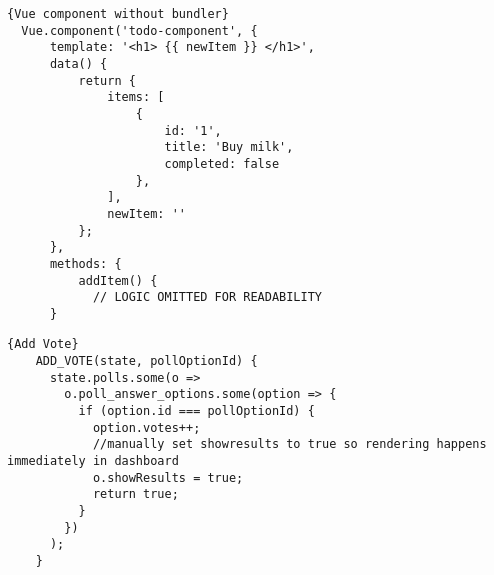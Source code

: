 \begin{lstlisting}[caption=Vue component without bundler, captionpos=b, style=htmlcssjs, label=compwobundler]{Vue component without bundler}
  Vue.component('todo-component', {
      template: '<h1> {{ newItem }} </h1>',
      data() {
          return {
              items: [
                  {
                      id: '1',
                      title: 'Buy milk',
                      completed: false
                  },
              ],
              newItem: ''
          };
      },
      methods: {
          addItem() {
            // LOGIC OMITTED FOR READABILITY
      }
  \end{lstlisting}

  \begin{lstlisting}[caption=Add Vote, captionpos=b, style=htmlcssjs, label=addvote]{Add Vote}
    ADD_VOTE(state, pollOptionId) {
      state.polls.some(o =>
        o.poll_answer_options.some(option => {
          if (option.id === pollOptionId) {
            option.votes++;
            //manually set showresults to true so rendering happens immediately in dashboard
            o.showResults = true;
            return true;
          }
        })
      );
    }
  \end{lstlisting}